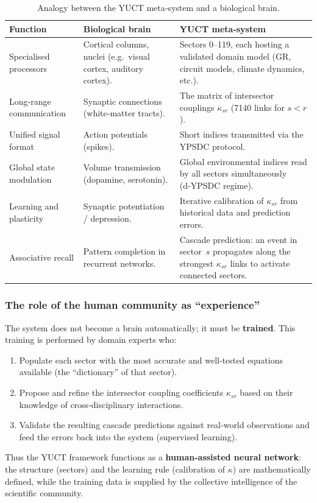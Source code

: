 \documentclass[13pt,a4paper]{article}
\begin{document}
	\begin{table}[htbp]
		\centering
		\caption{Analogy between the YUCT meta‑system and a biological brain.}
		\label{tab:brain-analogy}
		\small
		\begin{tabular}{p{3.5cm}p{5.5cm}p{5.5cm}}
			\toprule
			\textbf{Function} & \textbf{Biological brain} & \textbf{YUCT meta‑system} \\
			\midrule
			Specialised processors &
			Cortical columns, nuclei (e.g.\ visual cortex, auditory cortex). &
			Sectors 0--119, each hosting a validated domain model (GR, circuit models, climate dynamics, etc.). \\
			\midrule
			Long‑range communication &
			Synaptic connections (white‑matter tracts). &
			The matrix of intersector couplings
			\(\kappa_{sr}\) (7140 links for \(s<r\)). \\
			\midrule
			Unified signal format &
			Action potentials (spikes). &
			Short indices transmitted via the YPSDC
			protocol. \\
			\midrule
			Global state modulation &
			Volume transmission (dopamine, serotonin). &
			Global environmental indices read by all
			sectors simultaneously (d‑YPSDC regime). \\
			\midrule
			Learning and plasticity &
			Synaptic potentiation / depression. &
			Iterative calibration of \(\kappa_{sr}\) from
			historical data and prediction errors. \\
			\midrule
			Associative recall &
			Pattern completion in recurrent networks. &
			Cascade prediction: an event in sector~\(s\)
			propagates along the strongest
			\(\kappa_{sr}\) links to activate connected
			sectors. \\
			\bottomrule
		\end{tabular}
	\end{table}
	
	\subsubsection*{The role of the human community as ``experience''}
	The system does not become a brain automatically; it must be \textbf{trained}.
	This training is performed by domain experts who:
	\begin{enumerate}[leftmargin=*]
		\item Populate each sector with the most accurate and well‑tested equations
		available (the ``dictionary'' of that sector).
		\item Propose and refine the intersector coupling coefficients
		\(\kappa_{sr}\) based on their knowledge of cross‑disciplinary
		interactions.
		\item Validate the resulting cascade predictions against real‑world
		observations and feed the errors back into the system (supervised
		learning).
	\end{enumerate}
	Thus the YUCT framework functions as a \textbf{human‑assisted neural network}:
	the structure (sectors) and the learning rule (calibration of \(\kappa\)) are
	mathematically defined, while the training data is supplied by the collective
	intelligence of the scientific community.
	
\end{document}
